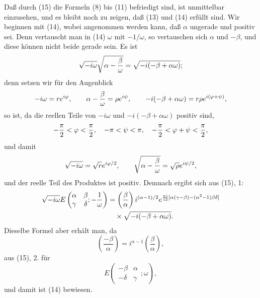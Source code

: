 \documentclass[11pt]{article}
\providecommand{\Jac}[2]{\left(\frac{#1}{#2}\right)}
\begin{document}
Daß durch (15) die Formeln (8) bis (11) befriedigt sind, ist unmittelbar einzusehen, und es bleibt noch zu zeigen, daß (13) und (14) erfüllt sind. Wir beginnen mit (14), wobei angenommen werden kann, daß $\alpha$ ungerade und positiv sei. Denn vertauscht man in (14) $\omega$ mit $-1/\omega$, so vertauschen sich $\alpha$ und $-\beta$, und diese können nicht beide gerade sein. Es ist
\[
\sqrt{-i\omega}\sqrt{\alpha-{\beta\over\omega}}=
\sqrt{-i(-\beta+\alpha\omega)};
\]
denn setzen wir für den Augenblick
\[
-i\omega=re^{i\varphi},
\qquad
\alpha-{\beta\over\omega}=\rho e^{i\psi},
\qquad
-i(-\beta+\alpha\omega)=r\rho e^{i(\varphi+\psi)},
\]
so ist, da die reellen Teile von $-i\omega$ und $-i(-\beta+\alpha\omega)$ positiv sind,
\[
-{\pi\over2}<\varphi<{\pi\over2},
\quad -\pi<\psi<\pi,
\quad -{\pi\over2}<\varphi+\psi<{\pi\over2},
\]
und damit
\[
\sqrt{-i\omega}=\sqrt r e^{i\varphi/2},
\qquad
\sqrt{\alpha-{\beta\over\omega}}=\sqrt\rho e^{i\psi/2},
\]
und der reelle Teil des Produktes ist positiv. Demnach ergibt sich aus (15), 1:
\begin{align*}
\sqrt{-i\omega}
E\left(\begin{matrix}\alpha&\beta\\ \gamma&\delta\end{matrix};-{1\over\omega}\right)
&=\Jac{\beta}{\alpha} i^{(\alpha-1)/2}
 e^{{\pi i\over12}[\alpha(\gamma-\beta)-(\alpha^2-1)\beta\delta]}\\
&\quad\times\sqrt{-i(-\beta+\alpha\omega)}.
\end{align*}
Dieselbe Formel aber erhält man, da
\[
\Jac{-\beta}{\alpha}=i^{\alpha-1}\Jac{\beta}{\alpha},
\]
aus (15), 2. für
\[
E\left(\begin{matrix}-\beta&\alpha\\ -\delta&\gamma\end{matrix};\omega\right),
\]
und damit ist (14) bewiesen.
\end{document}
